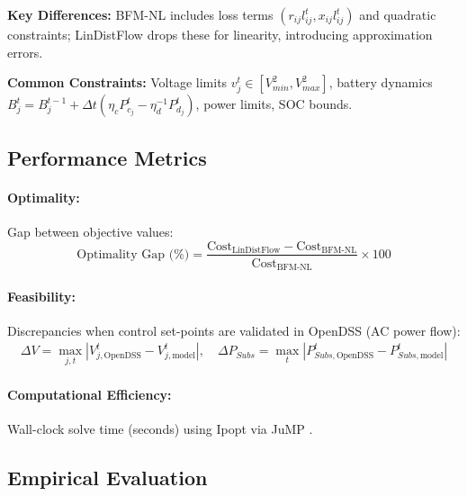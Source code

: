 \textbf{Key Differences:} BFM-NL includes loss terms $(r_{ij}l_{ij}^t, x_{ij}l_{ij}^t)$ and quadratic constraints; LinDistFlow drops these for linearity, introducing approximation errors.

\textbf{Common Constraints:} Voltage limits $v_j^t \in [V_{min}^2, V_{max}^2]$, battery dynamics $B_j^t = B_j^{t-1} + \Delta t(\eta_c P_{c_j}^t - \eta_d^{-1} P_{d_j}^t)$, power limits, SOC bounds.

\subsection{Performance Metrics}

\paragraph{Optimality:} Gap between objective values:
\begin{equation}
    \text{Optimality Gap (\%)} = \frac{\text{Cost}_{\text{LinDistFlow}} - \text{Cost}_{\text{BFM-NL}}}{\text{Cost}_{\text{BFM-NL}}} \times 100
\end{equation}

\paragraph{Feasibility:} Discrepancies when control set-points are validated in OpenDSS (AC power flow):
\begin{align}
    \Delta V = \max_{j,t} |V^t_{j,\text{OpenDSS}} - V^t_{j,\text{model}}|, \quad
    \Delta P_{Subs} = \max_{t} |P^t_{Subs,\text{OpenDSS}} - P^t_{Subs,\text{model}}|
\end{align}

\paragraph{Computational Efficiency:} Wall-clock solve time (seconds) using Ipopt \cite{ipopt-solver-Wachter2006Mar} via JuMP \cite{Lubin2023}.

\subsection{Empirical Evaluation}

